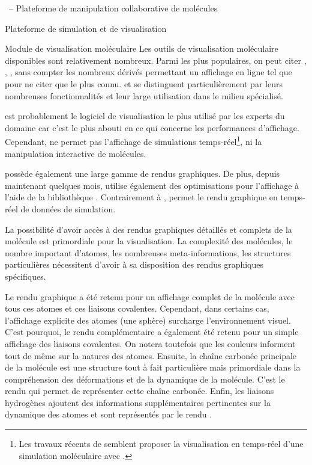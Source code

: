 \documentclass[myfrancais,ngerman,english,french]{mythesis}
\begin{document}
\begin{mychapter}{\myShaddock\ -- Plateforme de manipulation collaborative de molécules}
\begin{mysection}{Plateforme de simulation et de visualisation}
			\begin{mysubsection}{Module de visualisation moléculaire}
				Les outils de visualisation moléculaire disponibles sont relativement nombreux.
				Parmi les plus populaires, on peut citer \myPyMOL {},  , \myChimera {}, \myRasmol {} sans compter les nombreux dérivés permettant un affichage en ligne tel que \myJmol {} pour ne citer que le plus connu.
				\myPyMOL et  se distinguent particulièrement par leurs nombreuses fonctionnalités et leur large utilisation dans le milieu spécialisé.

				\myPyMOL est probablement le logiciel de visualisation le plus utilisé par les experts du domaine car c'est le plus abouti en ce qui concerne les performances d'affichage.
				Cependant, \myPyMOL ne permet pas l'affichage de simulations temps-réel\footnote{Les travaux récents de  semblent proposer la visualisation en temps-réel d'une simulation moléculaire avec \myPyMOL.}, ni la manipulation interactive de molécules.

				 possède également une large gamme de rendus graphiques.
				De plus, depuis maintenant quelques mois,  utilise également des optimisations \myGPU pour l'affichage à l'aide de la bibliothèque \myCUDA.
				Contrairement à \myPyMOL,  permet le rendu graphique en temps-réel de données de simulation.

				La possibilité d'avoir accès à des rendus graphiques détaillés et complets de la molécule est primordiale pour la visualisation.
				La complexité des molécules, le nombre important d'atomes, les nombreuses meta-informations, les structures particulières nécessitent d'avoir à sa disposition des rendus graphiques spécifiques.

				Le rendu graphique \myCPK a été retenu pour un affichage complet de la molécule avec tous ces atomes et ces liaisons covalentes.
				Cependant, dans certains cas, l'affichage explicite des atomes (une sphère) surcharge l'environnement visuel.
				C'est pourquoi, le rendu complémentaire \myLicorice a également été retenu pour un simple affichage des liaisons covalentes.
				On notera toutefois que les couleurs informent tout de même sur la natures des atomes.
				Ensuite, la chaîne carbonée principale de la molécule est une structure tout à fait particulière mais primordiale dans la compréhension des déformations et de la dynamique de la molécule.
				C'est le rendu \myNewRibbon qui permet de représenter cette chaîne carbonée.
				Enfin, les liaisons hydrogènes ajoutent des informations supplémentaires pertinentes sur la dynamique des atomes et sont représentés par le rendu \myHBonds.


\end{mysubsection}
\end{mysection}
\end{mychapter}
\end{document}
